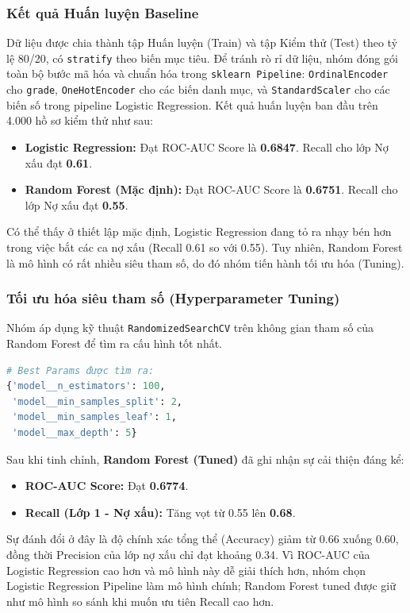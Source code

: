 \subsubsection{Kết quả Huấn luyện Baseline}
Dữ liệu được chia thành tập Huấn luyện (Train) và tập Kiểm thử (Test) theo tỷ lệ 80/20, có \texttt{stratify} theo biến mục tiêu. Để tránh rò rỉ dữ liệu, nhóm đóng gói toàn bộ bước mã hóa và chuẩn hóa trong \texttt{sklearn Pipeline}: \texttt{OrdinalEncoder} cho \texttt{grade}, \texttt{OneHotEncoder} cho các biến danh mục, và \texttt{StandardScaler} cho các biến số trong pipeline Logistic Regression. Kết quả huấn luyện ban đầu trên 4.000 hồ sơ kiểm thử như sau:

\begin{itemize}
    \item \textbf{Logistic Regression:} Đạt ROC-AUC Score là \textbf{0.6847}. Recall cho lớp Nợ xấu đạt \textbf{0.61}.
    \item \textbf{Random Forest (Mặc định):} Đạt ROC-AUC Score là \textbf{0.6751}. Recall cho lớp Nợ xấu đạt \textbf{0.55}.
\end{itemize}
Có thể thấy ở thiết lập mặc định, Logistic Regression đang tỏ ra nhạy bén hơn trong việc bắt các ca nợ xấu (Recall 0.61 so với 0.55). Tuy nhiên, Random Forest là mô hình có rất nhiều siêu tham số, do đó nhóm tiến hành tối ưu hóa (Tuning).

\subsubsection{Tối ưu hóa siêu tham số (Hyperparameter Tuning)}
Nhóm áp dụng kỹ thuật \texttt{RandomizedSearchCV} trên không gian tham số của Random Forest để tìm ra cấu hình tốt nhất. 
\begin{lstlisting}[language=Python, caption=Tối ưu hóa tham số với RandomizedSearchCV]
# Best Params được tìm ra:
{'model__n_estimators': 100, 
 'model__min_samples_split': 2, 
 'model__min_samples_leaf': 1, 
 'model__max_depth': 5}
\end{lstlisting}

Sau khi tinh chỉnh, \textbf{Random Forest (Tuned)} đã ghi nhận sự cải thiện đáng kể:
\begin{itemize}
    \item \textbf{ROC-AUC Score:} Đạt \textbf{0.6774}.
    \item \textbf{Recall (Lớp 1 - Nợ xấu):} Tăng vọt từ 0.55 lên \textbf{0.68}.
\end{itemize}

Sự đánh đổi ở đây là độ chính xác tổng thể (Accuracy) giảm từ 0.66 xuống 0.60, đồng thời Precision của lớp nợ xấu chỉ đạt khoảng 0.34. Vì ROC-AUC của Logistic Regression cao hơn và mô hình này dễ giải thích hơn, nhóm chọn Logistic Regression Pipeline làm mô hình chính; Random Forest tuned được giữ như mô hình so sánh khi muốn ưu tiên Recall cao hơn.

